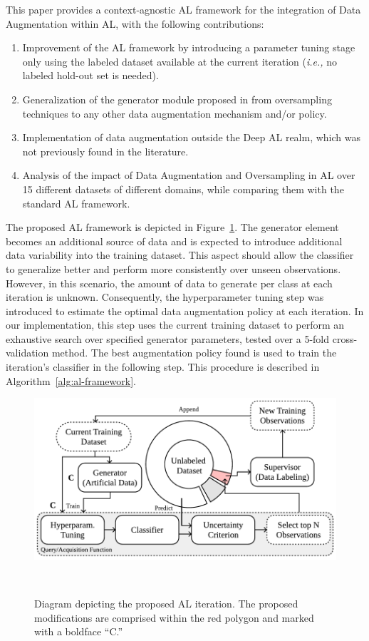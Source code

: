 This paper provides a context-agnostic AL framework for the integration of
Data Augmentation within AL, with the following contributions:

\begin{enumerate}
    \item Improvement of the AL framework by introducing a parameter tuning
        stage only using the labeled dataset available at the current
        iteration (\textit{i.e.,} no labeled hold-out set is needed).
    \item Generalization of the generator module proposed in
        \cite{Fonseca2021al} from oversampling techniques to any other data
        augmentation mechanism and/or policy.
    \item Implementation of data augmentation outside the Deep AL realm, which
        was not previously found in the literature.
    \item Analysis of the impact of Data Augmentation and Oversampling in AL
        over 15 different datasets of different domains, while comparing them
        with the standard AL framework.
\end{enumerate}

The proposed AL framework is depicted in Figure~\ref{fig:al_proposed}. The
generator element becomes an additional source of data and is expected to
introduce additional data variability into the training dataset. This aspect
should allow the classifier to generalize better and perform more consistently
over unseen observations. However, in this scenario, the amount of data to
generate per class at each iteration is unknown. Consequently, the
hyperparameter tuning step was introduced to estimate the optimal data
augmentation policy at each iteration. In our implementation, this step uses
the current training dataset to perform an exhaustive search over specified
generator parameters, tested over a 5-fold cross-validation method. The best
augmentation policy found is used to train the iteration's classifier in the
following step. This procedure is described in
Algorithm~\ref{alg:al-framework}.


\begin{figure}
	\centering
	\includegraphics[width=.6\linewidth]{al_proposed}
    \caption[Diagram depicting the proposed AL iteration.]{%
        Diagram depicting the proposed AL iteration. The proposed
        modifications are comprised within the red polygon and marked
        with a boldface ``C.''
    }~\label{fig:al_proposed}
\end{figure}


